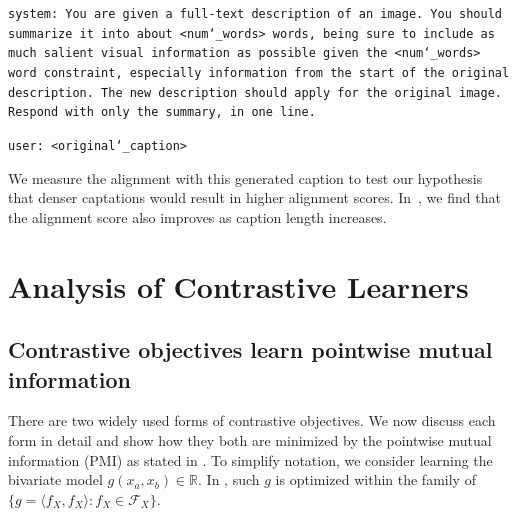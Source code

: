 \texttt{system: You are given a full-text description of an image. You should summarize it into about <num\char`_words> words, being sure to include as much salient visual information as possible given the <num\char`_words> word constraint, especially information from the start of the original description. The new description should apply for the original image. Respond with only the summary, in one line.}

\texttt{user: <original\char`_caption>}

We measure the alignment with this generated caption to test our hypothesis that denser captations would result in higher alignment scores. In~, we find that the alignment score also improves as caption length increases.

\section{Analysis of Contrastive Learners}\label{sec:analysis_contrastive}

\subsection{Contrastive objectives learn pointwise mutual information}\label{sec:analysis_contrastive-pmi}

There are two widely used forms of contrastive objectives. We now discuss each form in detail and show how they both are minimized by the pointwise mutual information (PMI) as stated in . To simplify notation, we consider learning the bivariate model $g(x_a, x_b) \in \mathbb{R}$. In ,  such $g$ is optimized within the family of $\{g = \langle f_X, f_X \rangle \colon f_X \in \mathcal{F}_X\}$. 

